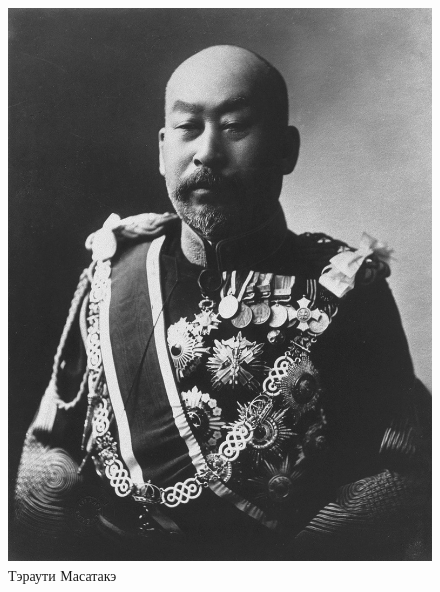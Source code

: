 \begin{figure}[h!tb] 
	\centering\includegraphics[scale=0.4]{Glava4/cjLahz3MIWA.jpg}
	\caption{Тэраути Масатакэ}%
\end{figure}

